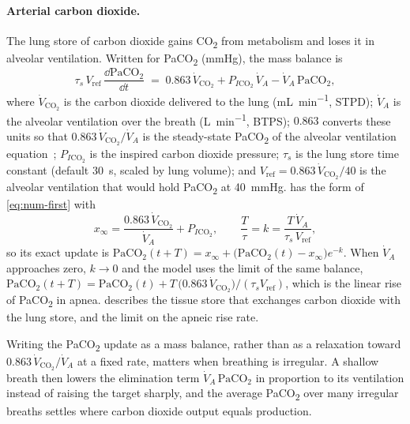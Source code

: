 \paragraph{Arterial carbon dioxide.} The lung store of carbon dioxide gains CO\textsubscript{2} from metabolism and loses it in alveolar ventilation. Written for PaCO\textsubscript{2} (\si{\mmHg}), the mass balance is
\begin{equation}
\tau_{s}\,V_{\mathrm{ref}}\,\frac{\dd \mathrm{PaCO_2}}{\dd t} \;=\; 0.863\,\dot V_{\mathrm{CO_2}} + P_{I\mathrm{CO_2}}\,\dot V_A - \dot V_A\,\mathrm{PaCO_2},
\label{eq:num-co2}
\end{equation}
where $\dot V_{\mathrm{CO_2}}$ is the carbon dioxide delivered to the lung (\si{\milli\liter\per\minute}, STPD); $\dot V_A$ is the alveolar ventilation over the breath (\si{\liter\per\minute}, BTPS); $0.863$ converts these units so that $0.863\,\dot V_{\mathrm{CO_2}}/\dot V_A$ is the steady-state PaCO\textsubscript{2} of the alveolar ventilation equation~\citep{west2012}; $P_{I\mathrm{CO_2}}$ is the inspired carbon dioxide pressure; $\tau_s$ is the lung store time constant (default \SI{30}{\second}, scaled by lung volume); and $V_{\mathrm{ref}} = 0.863\,\dot V_{\mathrm{CO_2}}/40$ is the alveolar ventilation that would hold PaCO\textsubscript{2} at \SI{40}{\mmHg}.  has the form of \cref{eq:num-first} with
\begin{equation}
x_\infty = \frac{0.863\,\dot V_{\mathrm{CO_2}}}{\dot V_A} + P_{I\mathrm{CO_2}},
\qquad
\frac{T}{\tau} = k = \frac{T\,\dot V_A}{\tau_s\,V_{\mathrm{ref}}},
\label{eq:num-co2-k}
\end{equation}
so its exact update is $\mathrm{PaCO_2}(t+T) = x_\infty + \bigl(\mathrm{PaCO_2}(t)-x_\infty\bigr)e^{-k}$. When $\dot V_A$ approaches zero, $k \to 0$ and the model uses the limit of the same balance, $\mathrm{PaCO_2}(t+T) = \mathrm{PaCO_2}(t) + T\,\bigl(0.863\,\dot V_{\mathrm{CO_2}}\bigr)/(\tau_s V_{\mathrm{ref}})$, which is the linear rise of PaCO\textsubscript{2} in apnea.  describes the tissue store that exchanges carbon dioxide with the lung store, and the limit on the apneic rise rate.

\begin{clinicalpearl}
Writing the PaCO\textsubscript{2} update as a mass balance, rather than as a relaxation toward $0.863\,\dot V_{\mathrm{CO_2}}/\dot V_A$ at a fixed rate, matters when breathing is irregular. A shallow breath then lowers the elimination term $\dot V_A\,\mathrm{PaCO_2}$ in proportion to its ventilation instead of raising the target sharply, and the average PaCO\textsubscript{2} over many irregular breaths settles where carbon dioxide output equals production.
\end{clinicalpearl}

